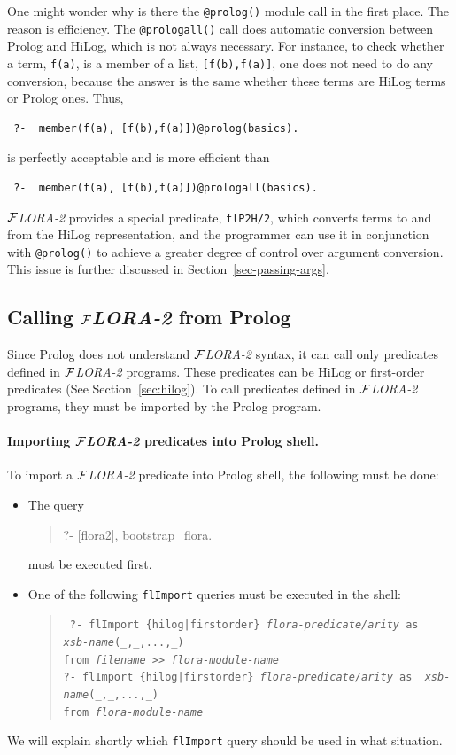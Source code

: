 \documentclass[11pt]{article}
\newcommand{\FLORA}{{\mbox{${\cal F}${\small\it LORA}\rm\emph{-2}}}\xspace}
\begin{document}
One might wonder why is there the {\tt @prolog()} module call in the first
place. The reason is efficiency. The {\tt @prologall()} call does automatic
conversion between Prolog and HiLog, which is not always necessary. For
instance, to check whether a term, {\tt f(a)}, is a member of a list,
{\tt [f(b),f(a)]}, one does not need to do any conversion, because the
answer is the same whether these terms are HiLog terms or Prolog
ones. Thus,
\begin{verbatim}
 ?-  member(f(a), [f(b),f(a)])@prolog(basics).
\end{verbatim}
is perfectly acceptable and is more efficient than
\begin{verbatim}
 ?-  member(f(a), [f(b),f(a)])@prologall(basics).
\end{verbatim}
\FLORA provides a special predicate, {\tt flP2H/2}, which converts terms to
and from the HiLog representation, and the programmer can use it in
conjunction with {\tt @prolog()} to achieve a greater degree of control
over argument conversion. This issue is further discussed in
Section~\ref{sec-passing-args}.



\subsection{Calling \FLORA from Prolog}

Since Prolog does not understand \FLORA syntax, it can call only
predicates defined in \FLORA programs. These predicates can be HiLog or
first-order predicates (See Section~\ref{sec:hilog}). To call predicates
defined in \FLORA programs, they must be imported by the Prolog program.

\paragraph{Importing \FLORA predicates into Prolog shell.}
To import a \FLORA predicate into Prolog shell, the following must be done:
\begin{itemize}
\item The query
\begin{quote}
 ?- [flora2], bootstrap\_flora.  
\end{quote}
must be executed first.
\item 
  One of the following {\tt flImport} queries must be executed in the shell:
  \begin{quote}
    \tt
    ?- flImport \{hilog|firstorder\} {\it flora-predicate/arity} as {\it
      xsb-name}(\_,\_,...,\_)\\
    \hspace*{5cm}from {\it filename} >> {\it flora-module-name}
    \\
    ?- flImport \{hilog|firstorder\} {\it flora-predicate/arity} as {\it 
      xsb-name}(\_,\_,...,\_)\\
    \hspace*{5cm}from {\it flora-module-name}
  \end{quote}
\end{itemize}
We will explain shortly which {\tt flImport} query should be used in what
situation.
\end{document}
